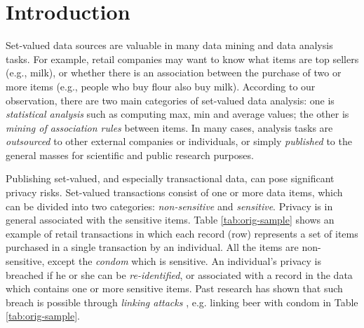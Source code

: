 \section{Introduction}
\label{sec:intro}

Set-valued data sources are valuable in many data mining and
data analysis tasks. For example, retail companies may want to know what
items are top sellers (e.g., milk), or whether there is an association
between the purchase of two or more items (e.g., people who buy flour also
buy milk).
According to our observation, there are two main categories of set-valued
data analysis: one is {\em statistical analysis} such as
computing max, min and average values;
the other is {\em mining of association rules} between items.
In many cases, analysis tasks
are {\em outsourced} to other external companies or
individuals, or simply {\em published} to the general
masses for scientific and public research purposes.

Publishing set-valued, and especially transactional data,
can pose significant privacy risks.
Set-valued transactions consist of one or more data items, 
which can be divided into two categories: {\em non-sensitive} and {\em sensitive}.
Privacy is in general associated with the sensitive items.
Table \ref{tab:orig-sample} shows
an example of retail transactions in which each record (row) represents
a set of items purchased in a single transaction by an individual.
All the items are non-sensitive, except the {\em condom}
which is sensitive. An individual's privacy is breached if he or she can be
{\em re-identified}, or associated with a record in the data which contains
one or more sensitive items.
Past research has shown that such breach is
possible through {\em linking attacks} \cite{FungWCY10:Survey,samarati1998}, e.g.
linking beer with condom in Table \ref{tab:orig-sample}.

